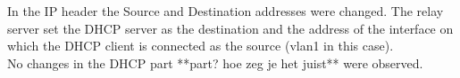 In the IP header the Source and Destination addresses were changed. The relay server set the DHCP server as the destination and the address of the interface on which the DHCP client is connected as the source (vlan1 in this case). \\
No changes in the DHCP part **part? hoe zeg je het juist** were observed. 
